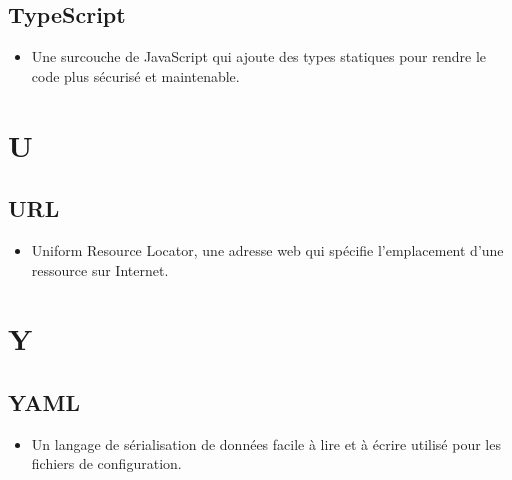 \begin{multicols}{2}
    \subsection*{TypeScript}
    \begin{itemize}
        \item Une surcouche de JavaScript qui ajoute des types statiques pour rendre le code plus sécurisé et maintenable.
    \end{itemize}

    \section*{U}

    \subsection*{URL}
    \begin{itemize}
        \item Uniform Resource Locator, une adresse web qui spécifie l'emplacement d'une ressource sur Internet.
    \end{itemize}

    \section*{Y}

    \subsection*{YAML}
    \begin{itemize}
        \item Un langage de sérialisation de données facile à lire et à écrire utilisé pour les fichiers de configuration.
    \end{itemize}
\end{multicols}

\clearpage